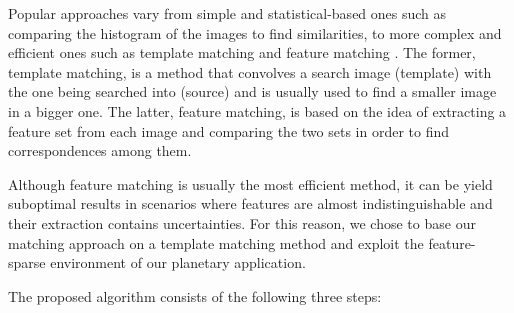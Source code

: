 Popular approaches vary from simple and statistical-based ones such as
comparing the histogram of the images to find similarities, to
more complex and efficient ones such as template matching and feature
matching \parencite{Jayanthi2016}.
The former, template matching, is a method that convolves a search
image (template) with the one being searched into (source) and is usually
used to find a smaller image in a bigger one.
The latter, feature matching, is based on the idea of extracting a feature
set from each image and comparing the two sets in order to find
correspondences among them.

Although feature matching is usually the most efficient method,
it can be yield suboptimal results in scenarios where features are
almost indistinguishable and their extraction contains uncertainties.
For this reason, we chose to base our matching approach on a
template matching method and exploit the feature-sparse environment
of our planetary application.

The proposed algorithm consists of the following three steps:

